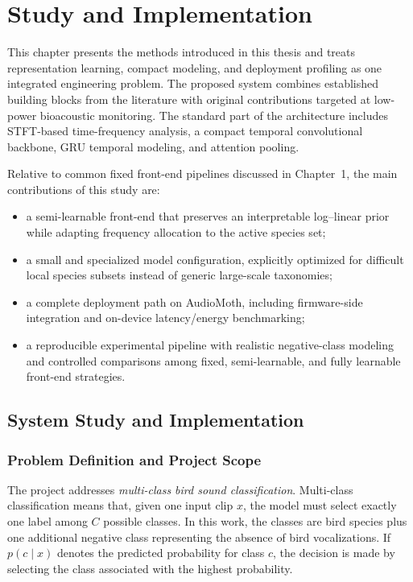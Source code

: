 \documentclass[a4paper,singleside,12pt]{report} %
\begin{document}
	\chapter{Study and Implementation}
	This chapter presents the methods introduced in this thesis and treats representation learning, compact modeling, and deployment profiling as one integrated engineering problem.
	The proposed system combines established building blocks from the literature with original contributions targeted at low-power bioacoustic monitoring. The standard part of the architecture includes STFT-based time-frequency analysis, a compact temporal convolutional backbone, GRU temporal modeling, and attention pooling.

	Relative to common fixed front-end pipelines discussed in Chapter~1, the main contributions of this study are:
	\begin{itemize}
		\item a semi-learnable front-end that preserves an interpretable log--linear prior while adapting frequency allocation to the active species set;
		\item a small and specialized model configuration, explicitly optimized for difficult local species subsets instead of generic large-scale taxonomies;
		\item a complete deployment path on AudioMoth, including firmware-side integration and on-device latency/energy benchmarking;
		\item a reproducible experimental pipeline with realistic negative-class modeling and controlled comparisons among fixed, semi-learnable, and fully learnable front-end strategies.
	\end{itemize}
	\section{System Study and Implementation}
	\subsection{Problem Definition and Project Scope}
	The project addresses \emph{multi-class bird sound classification}. Multi-class classification means that, given one input clip \(x\), the model must select exactly one label among \(C\) possible classes. In this work, the classes are bird species plus one additional negative class representing the absence of bird vocalizations. If \(p(c \mid x)\) denotes the predicted probability for class \(c\), the decision is made by selecting the class associated with the highest probability.
\end{document}

